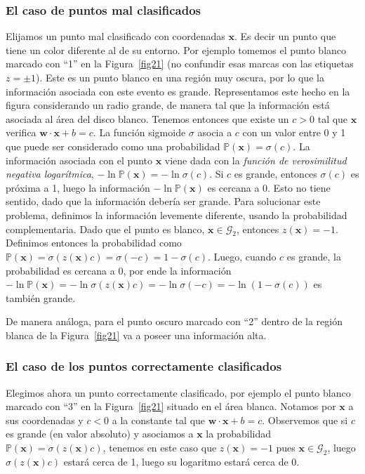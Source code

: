 \documentclass[12pt, a4paper]{amsbook}
\renewcommand{\P}{{\mathbb P}}
\newcommand{\G}{{\mathcal G}}
\newcommand{\ww}{{\mathbf w}}
\newcommand{\xx}{{\mathbf x}}
\theoremstyle{remark}
\theoremstyle{definition}
\numberwithin{section}{chapter}
\numberwithin{subsection}{section}
\numberwithin{equation}{section}
\numberwithin{figure}{chapter}
\begin{document}
\subsubsection*{El caso de puntos mal clasificados} Elijamos un punto mal clasificado con coordenadas $\xx$. Es decir un punto que tiene un color diferente al de su entorno. Por ejemplo tomemos el punto blanco marcado con ``1'' en la Figura~\ref{fig21} (no confundir esas marcas con las etiquetas $z=\pm1$). Este es un punto blanco en una región muy oscura, por lo que  la información asociada con este evento es grande. Representamos este hecho en la figura considerando un radio grande, de manera tal que la información está asociada al área del disco blanco. Tenemos entonces que existe un $c>0$ tal que $\xx$ verifica $\ww\cdot\xx + b = c$. La función sigmoide $\sigma$ asocia a $c$ con un valor entre 0 y 1 que puede ser considerado como una probabilidad $\P(\xx) = \sigma(c)$. La información asociada con el punto $\xx$ viene dada con la {\em función de verosimilitud negativa logarítmica}, $-\ln \P(\xx) = -\ln \sigma(c)$. Si $c$ es grande, entonces $\sigma(c)$ es próxima a 1, luego la información $-\ln\P(\xx)$ es cercana a 0. Esto no tiene sentido, dado que la información debería ser grande. Para solucionar este problema, definimos la información levemente diferente, usando la probabilidad complementaria. Dado que el punto es blanco, $\xx\in\G_2$, entonces $z(\xx) = -1$. Definimos entonces la probabilidad como $\P(\xx) = \sigma(z(\xx) c)=\sigma(-c) = 1-\sigma(c)$. Luego, cuando $c$ es grande, la probabilidad es cercana a 0, por ende la información $-\ln\P(\xx) = -\ln\sigma(z(\xx)c) = -\ln\sigma(-c) = -\ln(1-\sigma(c))$ es también grande.

De manera análoga, para el punto oscuro marcado con ``2'' dentro de la región blanca de la Figura~\ref{fig21} va a poseer una información alta.

\subsubsection*{El caso de los puntos correctamente clasificados} Elegimos ahora un punto correctamente clasificado, por ejemplo el punto blanco marcado con ``3'' en la Figura~\ref{fig21} situado en el área blanca. Notamos por $\xx$ a sus coordenadas y $c<0$ a la constante tal que $\ww\cdot\xx+ b=c$. Observemos que si $c$ es grande (en valor absoluto) y asociamos a $\xx$ la probabilidad $\P(\xx) = \sigma(z(\xx) c)$, tenemos en este caso que $z(\xx)=-1$ pues $\xx\in\G_2$, luego $\sigma(z(\xx)c)$ estará cerca de 1, luego su logaritmo estará cerca de 0. 
\end{document}
